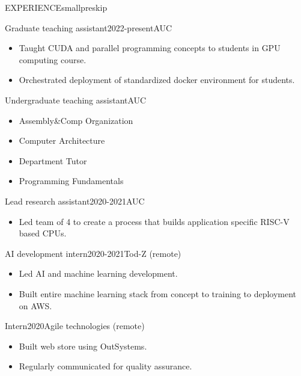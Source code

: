 \documentclass{resume}
\begin{document}
\begin{minipage}[t]{0.44\textwidth}
\begin{rsection}{\MakeUppercase{experience}}{smallpreskip}
		\begin{rcontent}{Graduate teaching assistant}{2022-present}{AUC}
			\begin{itemize}
				\item Taught CUDA and parallel programming concepts to students in GPU computing course.
				\item Orchestrated deployment of standardized docker environment for students.
			\end{itemize}
		\end{rcontent}
		\divider
		\begin{rcontent}{Undergraduate teaching assistant}{}{AUC}
			\begin{itemize}
				\item Assembly\&Comp Organization 
				\item Computer Architecture 
				\item Department Tutor 
				\item Programming Fundamentals 
			\end{itemize}
		\end{rcontent}
		\divider
		\begin{rcontent}{Lead research assistant}{2020-2021}{AUC}
			\begin{itemize}
				\item Led team of 4 to create a process that builds application specific RISC-V based CPUs.
			\end{itemize}
		\end{rcontent}
		\divider
		\begin{rcontent}{AI development intern}{2020-2021}{Tod-Z (remote)}
			\begin{itemize}
				\item Led AI and machine learning development.
				\item Built entire machine learning stack from concept to training to deployment on AWS.
			\end{itemize}
		\end{rcontent}
		\divider
		\begin{rcontent}{Intern}{2020}{Agile technologies (remote)}
			\begin{itemize}
				\item Built web store using OutSystems.
				\item Regularly communicated for quality assurance.
			\end{itemize}
		\end{rcontent}


\end{rsection}
\end{minipage}
\end{document}
